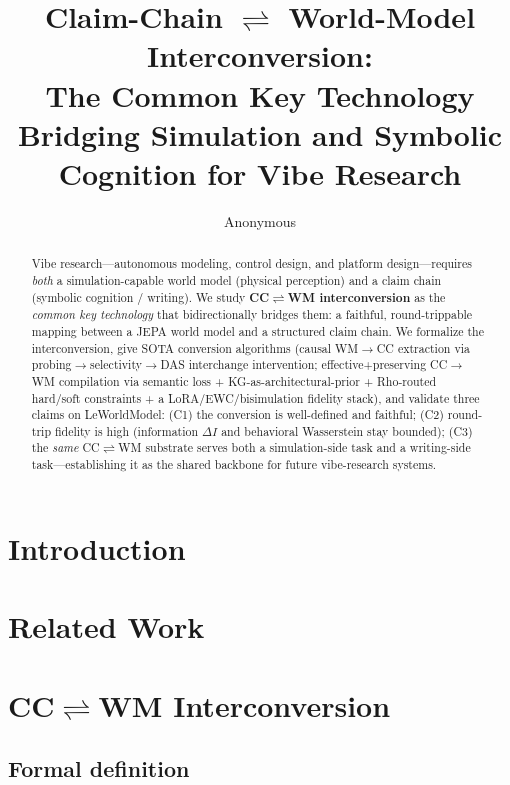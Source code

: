 \documentclass[10pt]{article}
\title{Claim-Chain $\rightleftharpoons$ World-Model Interconversion:\\
The Common Key Technology Bridging Simulation and Symbolic Cognition for Vibe Research}
\author{Anonymous}
\begin{document}
\maketitle

\begin{abstract}
Vibe research---autonomous modeling, control design, and platform design---requires
\emph{both} a simulation-capable world model (physical perception) and a claim chain
(symbolic cognition / writing). We study \textbf{CC$\rightleftharpoons$WM interconversion}
as the \emph{common key technology} that bidirectionally bridges them: a faithful,
round-trippable mapping between a JEPA world model and a structured claim chain.
We formalize the interconversion, give SOTA conversion algorithms
(causal WM$\to$CC extraction via probing$\to$selectivity$\to$DAS interchange intervention;
effective+preserving CC$\to$WM compilation via semantic loss + KG-as-architectural-prior
+ Rho-routed hard/soft constraints + a LoRA/EWC/bisimulation fidelity stack), and validate
three claims on LeWorldModel: (C1) the conversion is well-defined and faithful;
(C2) round-trip fidelity is high (information $\Delta I$ and behavioral Wasserstein stay
bounded); (C3) the \emph{same} CC$\rightleftharpoons$WM substrate serves both a
simulation-side task and a writing-side task---establishing it as the shared backbone
for future vibe-research systems.
\end{abstract}

\section{Introduction}

\section{Related Work}

\section{CC$\rightleftharpoons$WM Interconversion}
\subsection{Formal definition}
\end{document}
